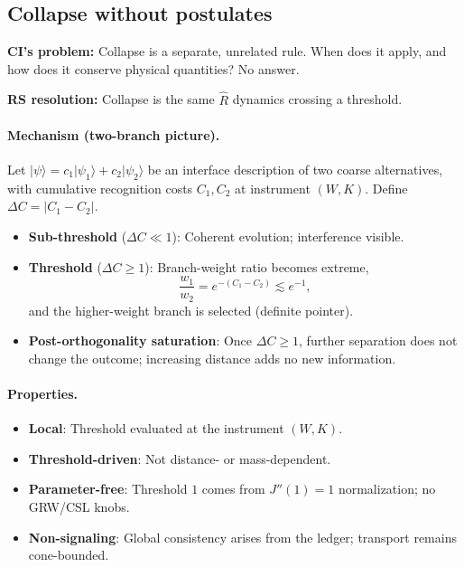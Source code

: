 \documentclass[11pt]{article}
\begin{document}
\subsection{Collapse without postulates}

\textbf{CI's problem:} Collapse is a separate, unrelated rule. When does it apply, and how does it conserve physical quantities? No answer.

\textbf{RS resolution:} Collapse is the same $\hat R$ dynamics crossing a threshold.

\paragraph{Mechanism (two-branch picture).}
Let $|\psi\rangle = c_1|\psi_1\rangle + c_2|\psi_2\rangle$ be an interface description of two coarse alternatives, with cumulative recognition costs $C_1, C_2$ at instrument $(W,K)$. Define $\Delta C = |C_1 - C_2|$.
\begin{itemize}[nosep]
  \item \textbf{Sub-threshold} ($\Delta C \ll 1$): Coherent evolution; interference visible.
  \item \textbf{Threshold} ($\Delta C \ge 1$): Branch-weight ratio becomes extreme,
  \begin{equation}
    \frac{w_1}{w_2} = e^{-(C_1 - C_2)} \lesssim e^{-1},
  \end{equation}
  and the higher-weight branch is selected (definite pointer).
  \item \textbf{Post-orthogonality saturation}: Once $\Delta C \ge 1$, further separation does not change the outcome; increasing distance adds no new information.
\end{itemize}

\paragraph{Properties.}
\begin{itemize}[nosep]
  \item \textbf{Local}: Threshold evaluated at the instrument $(W,K)$.
  \item \textbf{Threshold-driven}: Not distance- or mass-dependent.
  \item \textbf{Parameter-free}: Threshold $1$ comes from $J''(1)=1$ normalization; no GRW/CSL knobs.
  \item \textbf{Non-signaling}: Global consistency arises from the ledger; transport remains cone-bounded.
\end{itemize}
\end{document}

